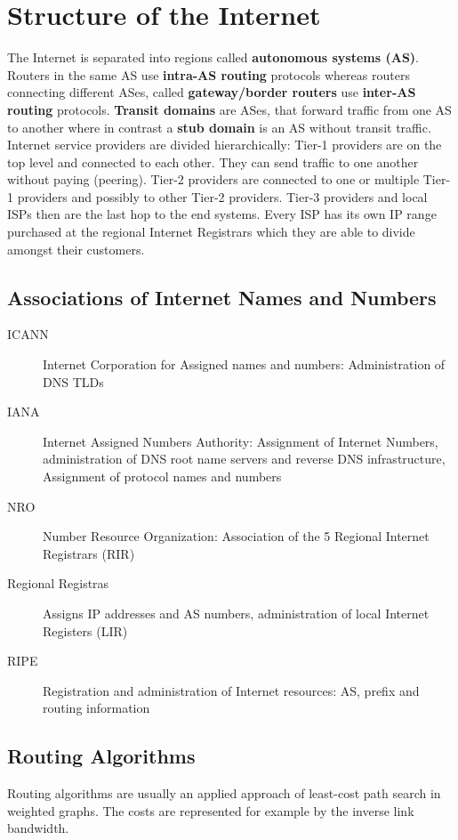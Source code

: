 
\section{Structure of the Internet}
The Internet is separated into regions called \textbf{autonomous systems (AS)}.
Routers in the same AS use \textbf{intra-AS routing} protocols whereas routers connecting different ASes, called \textbf{gateway/border routers} use \textbf{inter-AS routing} protocols.
\textbf{Transit domains} are ASes, that forward traffic from one AS to another where in contrast a \textbf{stub domain} is an AS without transit traffic.
Internet service providers are divided hierarchically: Tier-1 providers are on the top level and connected to each other.
They can send traffic to one another without paying (peering).
Tier-2 providers are connected to one or multiple Tier-1 providers and possibly to other Tier-2 providers.
Tier-3 providers and local ISPs then are the last hop to the end systems.
Every ISP has its own IP range purchased at the regional Internet Registrars which they are able to divide amongst their customers.

\subsection{Associations of Internet Names and Numbers}
\begin{description}
  \item[ICANN] Internet Corporation for Assigned names and numbers: Administration of DNS TLDs
  \item[IANA] Internet Assigned Numbers Authority: Assignment of Internet Numbers, administration of DNS root name servers and reverse DNS infrastructure, Assignment of protocol names and numbers
  \item[NRO] Number Resource Organization: Association of the 5 Regional Internet Registrars (RIR)
  \item[Regional Registras] Assigns IP addresses and AS numbers, administration of local Internet Registers (LIR)
  \item[RIPE] Registration and administration of Internet resources: AS, prefix and routing information
\end{description}

\subsection{Routing Algorithms}
Routing algorithms are usually an applied approach of least-cost path search in weighted graphs.
The costs are represented for example by the inverse link bandwidth.

